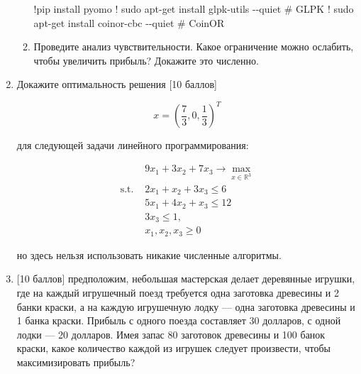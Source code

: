 \documentclass[
  russian,
  letterpaper,
  DIV=11,
  numbers=noendperiod]{scrartcl}
\newenvironment{Shaded}{\begin{snugshade}}{\end{snugshade}}
\newcommand{\CommentTok}[1]{\textcolor[rgb]{0.37,0.37,0.37}{#1}}
\newcommand{\NormalTok}[1]{\textcolor[rgb]{0.00,0.23,0.31}{#1}}
\newcommand{\OperatorTok}[1]{\textcolor[rgb]{0.37,0.37,0.37}{#1}}
\begin{document}
\begin{enumerate}
\begin{enumerate}
\begin{Shaded}
\begin{Highlighting}[]
\OperatorTok{!}\NormalTok{pip install pyomo}
\OperatorTok{!}\NormalTok{ sudo apt}\OperatorTok{{-}}\NormalTok{get install glpk}\OperatorTok{{-}}\NormalTok{utils }\OperatorTok{{-}{-}}\NormalTok{quiet  }\CommentTok{\# GLPK}
\OperatorTok{!}\NormalTok{ sudo apt}\OperatorTok{{-}}\NormalTok{get install coinor}\OperatorTok{{-}}\NormalTok{cbc }\OperatorTok{{-}{-}}\NormalTok{quiet  }\CommentTok{\# CoinOR}
\end{Highlighting}
\end{Shaded}
  \item
    Проведите анализ чувствительности. Какое ограничение можно ослабить,
    чтобы увеличить прибыль? Докажите это численно.
  \end{enumerate}
\item
  Докажите оптимальность решения {[}10 баллов{]}

  \[
   x = \left(\frac{7}{3} , 0, \frac{1}{3}\right)^T
   \]

  для следующей задачи линейного программирования:

  \[
   \begin{split}
   & 9x_1 + 3x_2 + 7x_3 \to \max\limits_{x \in \mathbb{R}^3 }\\
   \text{s.t. } & 2x_1 + x_2 + 3x_3 \leq 6 \\
   & 5x_1 + 4x_2 + x_3 \leq 12 \\
   & 3x_3 \leq 1,\\
   & x_1, x_2, x_3 \geq 0
   \end{split}
   \]

  но здесь нельзя использовать никакие численные алгоритмы.
\item
  {[}10 баллов{]} предположим, небольшая мастерская делает деревянные
  игрушки, где на каждый игрушечный поезд требуется одна заготовка
  древесины и 2 банки краски, а на каждую игрушечную лодку --- одна
  заготовка древесины и 1 банка краски. Прибыль с одного поезда
  составляет 30 долларов, с одной лодки --- 20 долларов. Имея запас 80
  заготовок древесины и 100 банок краски, какое количество каждой из
  игрушек следует произвести, чтобы максимизировать прибыль?


\end{enumerate}
\end{document}

